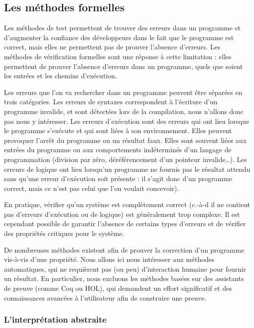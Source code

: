 \subsection{Les méthodes formelles}

Les méthodes de test permettent de trouver des erreurs dans un programme
et d'augmenter la confiance des développeurs dans le fait que le
programme est correct, mais elles ne permettent pas de prouver l'absence
d'erreurs.
Les méthodes de vérification formelles sont une réponse à cette limitation :
elles permettent de prouver l'absence d'erreurs dans un programme,
quels que soient les entrées et les chemins d'exécution.

Les erreurs que l'on va rechercher dans un programme peuvent être séparées en
trois catégories. Les erreurs de syntaxes correspondent à l'écriture d'un
programme invalide, et sont détectées lors de la compilation, nous n'allons donc
pas nous y intéresser. Les erreurs d'exécution sont des erreurs qui ont lieu
lorsque le programme s'exécute et qui sont liées à son environnement. Elles
peuvent provoquer l'arrêt du programme ou un résultat faux. Elles sont souvent
liées aux entrées du programme ou aux comportements indéterminés d'un langage de
programmation (division par zéro, déréférencement d'un pointeur invalide\dots).
Les erreurs de logique ont lieu lorsqu'un programme ne fournis pas le résultat
attendu sans qu'une erreur d'exécution soit présente : il s'agit donc d'un
programme correct, mais ce n'est pas celui que l'on voulait concevoir).

En pratique, vérifier qu'un système est complètement correct (c.-à-d il ne
contient pas d'erreurs d'exécution ou de logique) est généralement trop
complexe. Il est cependant possible de garantir l'absence de certains types
d'erreurs et de vérifier des propriétés critiques pour le système.

De nombreuses méthodes existent afin de prouver la correction d'un
programme vis-à-vis d'une propriété. Nous allons ici nous intéresser aux
méthodes automatiques, qui ne requièrent pas (ou peu) d'interaction
humaine pour fournir un résultat. En particulier, nous excluons les
méthodes basées sur des assistants de preuve (comme Coq ou HOL), qui
demandent un effort significatif et des connaissances avancées à
l'utilisateur afin de construire une preuve.

\subsubsection{L'interprétation abstraite}

